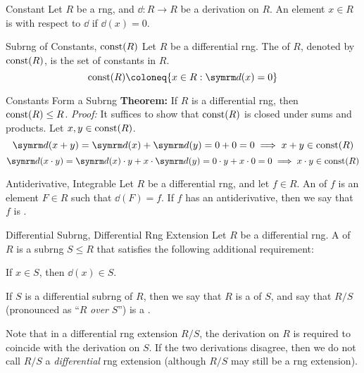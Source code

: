 \begin{dfnbox}{Constant}
	Let $R$ be a rng, and $\dd: R \to R$ be a derivation on $R$. An element $x \in R$ is  with respect to $\dd$ if $\dd(x) = 0$.
\end{dfnbox}

\begin{dfnbox}{Subrng of Constants, $\operatorname{const}(R)$}
	Let $R$ be a differential rng. The  of $R$, denoted by $\operatorname{const}(R)$, is the set of constants in $R$.
	\[ \const(R) \coloneq \{ x \in R : \dd(x) = 0 \} \]
\end{dfnbox}

\begin{thmbox}{Constants Form a Subrng}
	\textbf{Theorem:} If $R$ is a differential rng, then $\operatorname{const}(R) \le R$.
\tcblower
	\textit{Proof:} It suffices to show that $\operatorname{const}(R)$ is closed under sums and products. Let $x, y \in \operatorname{const}(R)$.
	\[ \dd(x + y) = \dd(x) + \dd(y) = 0 + 0 = 0 \implies x + y \in \const(R) \]
	\[ \dd(x \cdot y) = \dd(x) \cdot y + x \cdot \dd(y) = 0 \cdot y + x \cdot 0 = 0 \implies x \cdot y \in \const(R) \]
\end{thmbox}

\begin{dfnbox}{Antiderivative, Integrable}
	Let $R$ be a differential rng, and let $f \in R$. An  of $f$ is an element $F \in R$ such that $\dd(F) = f$. If $f$ has an antiderivative, then we say that $f$ is .
\end{dfnbox}

\begin{dfnbox}{Differential Subrng, Differential Rng Extension}
	Let $R$ be a differential rng. A  of $R$ is a subrng $S \le R$ that satisfies the following additional requirement:
	\begin{dfnitems}
		\item {} If $x \in S$, then $\dd(x) \in S$.
	\end{dfnitems}
	If $S$ is a differential subrng of $R$, then we say that $R$ is a  of $S$, and say that $R/S$ (pronounced as ``$R$ \textit{over} $S$'') is a .
\end{dfnbox}

Note that in a differential rng extension $R/S$, the derivation on $R$ is required to coincide with the derivation on $S$. If the two derivations disagree, then we do not call $R/S$ a \textit{differential} rng extension (although $R/S$ may still be a rng extension).

